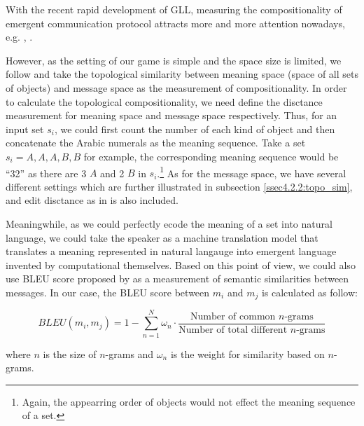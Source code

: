 With the recent rapid development of GLL, measuring the compositionality of emergent communication protocol attracts more and more attention nowadays, e.g. \cite{andreas2019measuring}, \cite{lowe2019pitfalls}.

However, as the setting of our game is simple and the space size is limited, we follow \cite{brighton2006understanding} and take the topological similarity between meaning space (space of all sets of objects) and message space as the measurement of compositionality. In order to calculate the topological compositionality, we need define the disctance measurement for meaning space and message space respectively. Thus, for an input set $s_i$, we could first count the number of each kind of object and then concatenate the Arabic numerals as the meaning sequence. Take a set $s_i={A, A, A, B, B}$ for example, the corresponding meaning sequence would be ``32'' as there are 3 $A$ and 2 $B$ in $s_i$.\footnote{Again, the appearring order of objects would not effect the meaning sequence of a set.} As for the message space, we have several different settings which are further illustrated in subsection \ref{ssec4.2.2:topo_sim}, and edit disctance as in \cite{brighton2006understanding} is also included.

Meaningwhile, as we could perfectly ecode the meaning of a set into natural language, we could take the speaker as a machine translation model that translates a meaning represented in natural langauge into emergent language invented by computational themselves. Based on this point of view, we could also use BLEU score proposed by \cite{papineni2002bleu} as a measurement of semantic similarities between messages. In our case, the BLEU score between $m_i$ and $m_j$ is calculated as follow:

\begin{equation}
  BLEU(m_i, m_j) = 1 - \sum_{n=1}^{N} \omega_n \cdot \frac{\mbox{Number of common } n\mbox{-grams}}{\mbox{Number of total different } n\mbox{-grams}}
  \label{eq3.3.1:bleu_score}
\end{equation}

where $n$ is the size of $n$-grams and $\omega_n$ is the weight for similarity based on $n$-grams.
